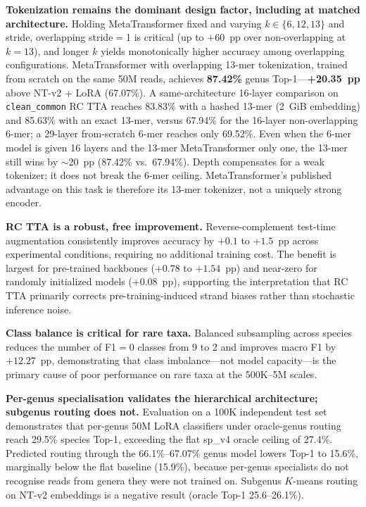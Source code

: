 \textbf{Tokenization remains the dominant design factor, including at matched architecture.} Holding MetaTransformer fixed and varying $k \in \{6, 12, 13\}$ and stride, overlapping stride$=$1 is critical (up to $+60$~pp over non-overlapping at $k=13$), and longer $k$ yields monotonically higher accuracy among overlapping configurations. MetaTransformer with overlapping 13-mer tokenization, trained from scratch on the same 50M reads, achieves \textbf{87.42\%} genus Top-1---\textbf{+20.35~pp} above NT-v2 + LoRA (67.07\%). A same-architecture 16-layer comparison on \texttt{clean\_common} RC TTA reaches 83.83\% with a hashed 13-mer (2~GiB embedding) and 85.63\% with an exact 13-mer, versus 67.94\% for the 16-layer non-overlapping 6-mer; a 29-layer from-scratch 6-mer reaches only 69.52\%. Even when the 6-mer model is given 16 layers and the 13-mer MetaTransformer only one, the 13-mer still wins by $\sim$20~pp (87.42\% vs.\ 67.94\%). Depth compensates for a weak tokenizer; it does not break the 6-mer ceiling. MetaTransformer's published advantage on this task is therefore its 13-mer tokenizer, not a uniquely strong encoder.

\textbf{RC TTA is a robust, free improvement.} Reverse-complement test-time augmentation consistently improves accuracy by $+0.1$ to $+1.5$~pp across experimental conditions, requiring no additional training cost. The benefit is largest for pre-trained backbones ($+0.78$ to $+1.54$~pp) and near-zero for randomly initialized models ($+0.08$~pp), supporting the interpretation that RC TTA primarily corrects pre-training-induced strand biases rather than stochastic inference noise.

\textbf{Class balance is critical for rare taxa.} Balanced subsampling across species reduces the number of F1$=$0 classes from 9 to 2 and improves macro F1 by $+12.27$~pp, demonstrating that class imbalance---not model capacity---is the primary cause of poor performance on rare taxa at the 500K--5M scales.

\textbf{Per-genus specialisation validates the hierarchical architecture; subgenus routing does not.} Evaluation on a 100K independent test set demonstrates that per-genus 50M LoRA classifiers under oracle-genus routing reach 29.5\% species Top-1, exceeding the flat sp\_v4 oracle ceiling of 27.4\%. Predicted routing through the 66.1\%--67.07\% genus model lowers Top-1 to 15.6\%, marginally below the flat baseline (15.9\%), because per-genus specialists do not recognise reads from genera they were not trained on. Subgenus $K$-means routing on NT-v2 embeddings is a negative result (oracle Top-1 25.6--26.1\%).

